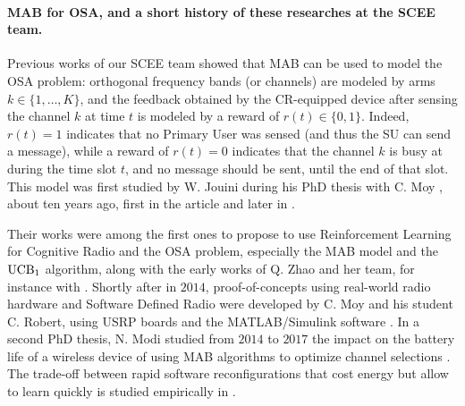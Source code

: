 \paragraph{MAB for OSA, and a short history of these researches at the SCEE team.}
%
Previous works of our SCEE team showed that MAB can be used to model the OSA problem:
orthogonal frequency bands (or channels) are modeled by arms $k\in\{1,\dots,K\}$,
and the feedback obtained by the CR-equipped device after sensing the channel $k$ at time $t$ is modeled by a reward of $r(t) \in \{0,1\}$.
Indeed, $r(t) = 1$ indicates that no Primary User was sensed (and thus the SU can send a message), while a reward of $r(t)=0$ indicates that the channel $k$ is busy at during the time slot $t$, and no message should be sent, until the end of that slot.
%
This model was first studied by W. Jouini during his PhD thesis with C. Moy \cite{Jouini12PhD}, about ten years ago, first in the article \cite{Jouini09} and later in \cite{Jouini10,Jouini12}.

Their works were among the first ones to propose to use Reinforcement Learning for Cognitive Radio and the OSA problem, especially the MAB model and the $\mathrm{UCB}_1$ algorithm,
along with the early works of Q. Zhao and her team, for instance with \cite{Liu08,Zhao10}.
%
Shortly after in $2014$, proof-of-concepts using real-world radio hardware and Software Defined Radio were developed by C. Moy and his student C. Robert, using USRP boards and the MATLAB/Simulink software \cite{RobertSDR2014,MoyWSR2014}.
In a second PhD thesis, N. Modi studied from $2014$ to $2017$ the impact on the battery life of a wireless device of using MAB algorithms to optimize channel selections \cite{Modi17PhD}.
The trade-off between rapid software reconfigurations that cost energy but allow to learn quickly is studied empirically in \cite{modiDemo2016}.

